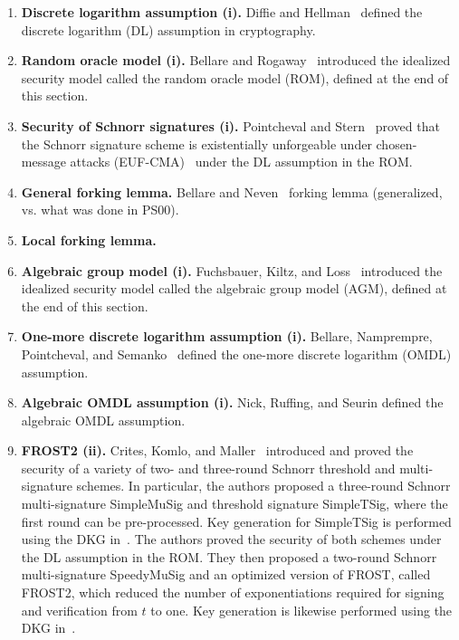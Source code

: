 \begin{enumerate}  
\item \textbf{Discrete logarithm assumption (i).}  Diffie and Hellman~\cite{DiffieH76} defined the discrete logarithm (DL) assumption in cryptography. 
\item \textbf{Random oracle model (i).}  Bellare and Rogaway~\cite{BellareR93} introduced the idealized security model called the random oracle model (ROM), defined at the end of this section.  
\item \textbf{Security of Schnorr signatures (i).}  Pointcheval and Stern~\cite{PointchevalS00} proved that the Schnorr signature scheme is existentially unforgeable under chosen-message attacks (EUF-CMA)~\cite{GoldwasserMR88} under the DL assumption in the ROM.  
\item \textbf{General forking lemma.} Bellare and Neven~\cite{BellareN06} forking lemma (generalized, vs. what was done in PS00). 
\item \textbf{Local forking lemma.} 
\item \textbf{Algebraic group model (i).}  Fuchsbauer, Kiltz, and Loss~\cite{FuchsbauerKL18} introduced the idealized security model called the algebraic group model (AGM), defined at the end of this section.  
\item \textbf{One-more discrete logarithm assumption (i).}  Bellare, Namprempre, Pointcheval, and Semanko~\cite{BellareNPS03} defined the one-more discrete logarithm (OMDL) assumption.
\item \textbf{Algebraic OMDL assumption (i).}  Nick, Ruffing, and Seurin  defined the algebraic OMDL assumption.  
\item \textbf{FROST2 (ii).} Crites, Komlo, and Maller~\cite{CritesKM21} introduced and proved the security of a variety of two- and three-round Schnorr threshold and multi-signature schemes.  In particular, the authors proposed a three-round Schnorr multi-signature SimpleMuSig and threshold signature SimpleTSig, where the first round can be pre-processed.  Key generation for SimpleTSig is performed using the DKG in~\cite{KomloG20}.  The authors proved the security of both schemes under the DL assumption in the ROM.   They then proposed a two-round Schnorr multi-signature SpeedyMuSig and an optimized version of FROST, called FROST2, which reduced the number of exponentiations required for signing and verification from $t$ to one.   Key generation is likewise performed using the DKG in~\cite{KomloG20}.

\end{enumerate}
